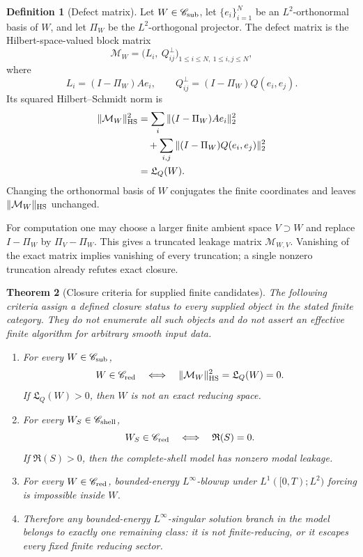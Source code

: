 \documentclass[aps,prd,reprint,superscriptaddress,nofootinbib,floatfix]{revtex4-2}
\newtheorem{theorem}{Theorem}
\theoremstyle{definition}
\newtheorem{definition}[theorem]{Definition}
\theoremstyle{remark}
\newcommand{\cM}{\mathcal{M}}
\begin{document}
\begin{definition}[Defect matrix]
	Let \(W\in\mathscr C_{\rm sub}\), let \(\{e_i\}_{i=1}^N\) be an \(L^2\)-orthonormal basis of \(W\), and let \(\Pi_W\) be the \(L^2\)-orthogonal projector.  The defect matrix is the Hilbert-space-valued block matrix
	\begin{equation}
		\cM_W=
		\big(
		L_i,\ Q_{ij}^{\perp}
		\big)_{1\le i\le N,\ 1\le i,j\le N},
		\label{eq:closure-matrix}
	\end{equation}
	where
	\[
		L_i=(I-\Pi_W)Ae_i,\qquad
		Q_{ij}^{\perp}=(I-\Pi_W)Q(e_i,e_j).
	\]
	Its squared Hilbert--Schmidt norm is
	\begin{align}
		\|\cM_W\|_{\rm HS}^2
		 & =
		\sum_i\|(I-\Pi_W)Ae_i\|_2^2 \nonumber           \\
		 & \quad+
		\sum_{i,j}\|(I-\Pi_W)Q(e_i,e_j)\|_2^2 \nonumber \\
		 & =
		\mathfrak L_Q(W).
		\label{eq:closure-matrix-norm}
	\end{align}
	Changing the orthonormal basis of \(W\) conjugates the finite coordinates and leaves \(\|\cM_W\|_{\rm HS}\) unchanged.
\end{definition}

For computation one may choose a larger finite ambient space \(V\supset W\) and replace \(I-\Pi_W\) by \(\Pi_V-\Pi_W\).  This gives a truncated leakage matrix \(\cM_{W,V}\).  Vanishing of the exact matrix implies vanishing of every truncation; a single nonzero truncation already refutes exact closure.

\begin{theorem}[Closure criteria for supplied finite candidates]
	\label{thm:finitecategorycomplete}
	The following criteria assign a defined closure status to every supplied object in the stated finite category. They do not enumerate all such objects and do not assert an effective finite algorithm for arbitrary smooth input data.
	\begin{enumerate}[label=(\roman*),leftmargin=*]
		\item For every \(W\in\mathscr C_{\rm sub}\),
		      \[
			      W\in\mathscr C_{\rm red}
			      \quad\Longleftrightarrow\quad
			      \|\cM_W\|_{\rm HS}^2=\mathfrak L_Q(W)=0.
		      \]
		      If \(\mathfrak L_Q(W)>0\), then \(W\) is not an exact reducing space.
		\item For every \(W_S\in\mathscr C_{\rm shell}\),
		      \[
			      W_S\in\mathscr C_{\rm red}
			      \quad\Longleftrightarrow\quad
			      \mathfrak R(S)=0.
		      \]
		      If \(\mathfrak R(S)>0\), then the complete-shell model has nonzero modal leakage.
		\item For every \(W\in\mathscr C_{\rm red}\), bounded-energy \(L^\infty\)-blowup under \(L^1([0,T);L^2)\) forcing is impossible inside \(W\).
		\item Therefore any bounded-energy \(L^\infty\)-singular solution branch in the model belongs to exactly one remaining class: it is not finite-reducing, or it escapes every fixed finite reducing sector.
	\end{enumerate}
\end{theorem}
\end{document}
